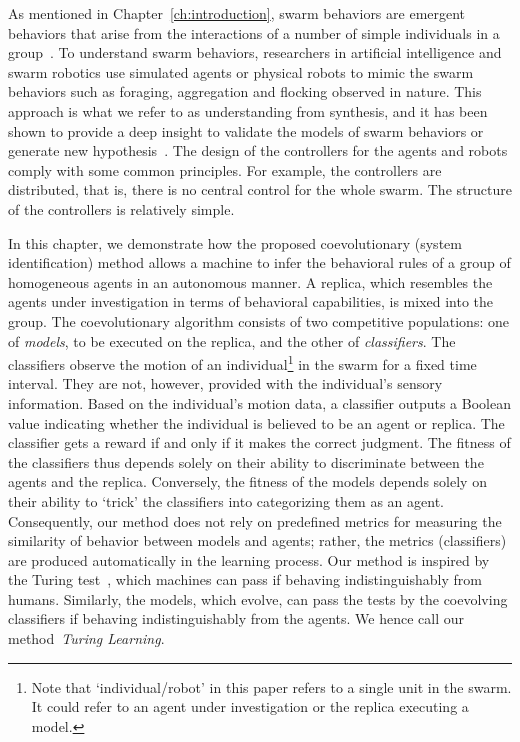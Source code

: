 As mentioned in Chapter~\ref{ch:introduction}, swarm behaviors are emergent behaviors that arise from the interactions of a number of simple individuals in a group~\cite{Camazine2001}. To understand swarm behaviors, researchers in artificial intelligence and swarm robotics use simulated agents or physical robots to mimic the swarm behaviors such as foraging, aggregation and flocking observed in nature. This approach is what we refer to as understanding from synthesis, and it has been shown to provide a deep insight to validate the models of swarm behaviors or generate new hypothesis~\cite{J.Halloy2007}. The design of the controllers for the agents and robots comply with some common principles. For example, the controllers are distributed, that is, there is no central control for the whole swarm. The structure of the controllers is relatively simple. 

In this chapter, we demonstrate how the proposed coevolutionary (system identification) method allows a machine to infer the behavioral rules of a group of homogeneous agents in an autonomous manner. A replica, which resembles the agents under investigation in terms of behavioral capabilities, is mixed into the group. The coevolutionary algorithm consists of two competitive populations: one of \textit{models}, to be executed on the replica, and the other of \textit{classifiers}. The classifiers observe the motion of an individual\footnote{Note that `individual/robot' in this paper refers to a single unit in the swarm. It could refer to an agent under investigation or the replica executing a model.} in the swarm for a fixed time interval. They are not, however, provided with the individual's sensory information. Based on the individual's motion data, a classifier outputs a Boolean value indicating whether the individual is believed to be an agent or replica. The classifier gets a reward if and only if it makes the correct judgment. The fitness of the classifiers thus depends solely on their ability to discriminate between the agents and the replica. Conversely, the fitness of the models depends solely on their ability to `trick' the classifiers into categorizing them as an agent. Consequently, our method does not rely on predefined metrics for measuring the similarity of behavior between models and agents; rather, the metrics (classifiers) are produced automatically in the learning process. Our method is inspired by the Turing test~\cite{Turing1950, Harnad2000}, which machines can pass if behaving indistinguishably from humans. Similarly, the models, which evolve, can pass the tests by the coevolving classifiers if behaving indistinguishably from the agents. We hence call our method~\textit{Turing Learning}.

